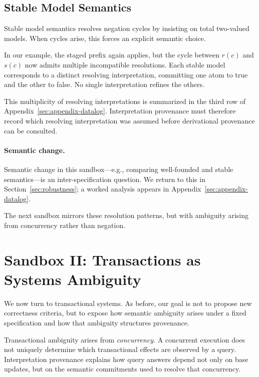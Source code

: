 \documentclass[acmsmall,nonacm]{acmart}
\theoremstyle{remark}
\numberwithin{definition}{section}
\numberwithin{theorem}{section}
\numberwithin{lemma}{section}
\numberwithin{corollary}{section}
\numberwithin{remark}{section}
\numberwithin{example}{section}
\numberwithin{observation}{section}
\numberwithin{assumption}{section}
\begin{document}
\subsection{Stable Model Semantics}

Stable model semantics resolves negation cycles by insisting on total two-valued
models.
When cycles arise, this forces an explicit semantic choice.

In our example, the staged prefix again applies, but the cycle between $r(c)$ and
$s(c)$ now admits multiple incompatible resolutions.
Each stable model corresponds to a distinct resolving interpretation, committing
one atom to true and the other to false.
No single interpretation refines the others.

This multiplicity of resolving interpretations is summarized in the third row of
Appendix~\ref{sec:appendix-datalog}.
Interpretation provenance must therefore record which resolving interpretation was
assumed before derivational provenance can be consulted.

\paragraph{Semantic change.}
Semantic change in this sandbox—e.g., comparing well-founded and stable
semantics—is an inter-specification question.
We return to this in Section~\ref{sec:robustness}; a worked analysis appears in
Appendix~\ref{sec:appendix-datalog}.

The next sandbox mirrors these resolution patterns, but with ambiguity arising
from concurrency rather than negation.

\section{Sandbox II: Transactions as Systems Ambiguity}
\label{sec:transactions}

We now turn to transactional systems.
As before, our goal is not to propose new correctness criteria, but to expose how
semantic ambiguity arises under a fixed specification and how that ambiguity
structures provenance.

Transactional ambiguity arises from \emph{concurrency}.
A concurrent execution does not uniquely determine which transactional effects
are observed by a query.
Interpretation provenance explains how query answers depend not only on base
updates, but on the semantic commitments used to resolve that concurrency.
\end{document}
